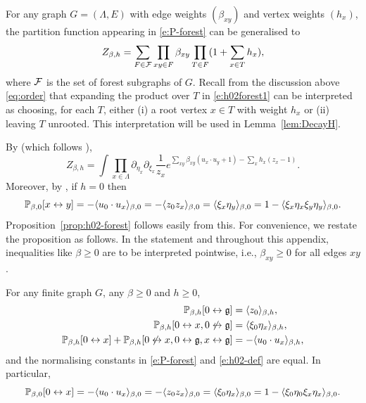 \documentclass[11pt]{amsart}
\numberwithin{equation}{section}
\numberwithin{theorem}{section}
\newcommand{\ghost}{\mathfrak{g}}
\newcommand{\conn}{\leftrightarrow}
\newcommand{\nconn}{\not\leftrightarrow}
\newcommand{\1}{{\bf 1}}
\begin{document}
For any graph $G=(\Lambda,E)$ with edge weights $(\beta_{xy})$ and
vertex weights $(h_x)$, the partition function appearing in
\eqref{e:P-forest} can be generalised to
\begin{equation} \label{e:h02forest1}
  Z_{\beta,h}
  = \sum_{F\in\mathcal F} \prod_{xy\in F}\beta_{xy}\prod_{T\in F} (1+\sum_{x\in T}h_{x}),
\end{equation}
where $\mathcal F$ is the set of forest subgraphs of $G$.
Recall from
the discussion above \eqref{eq:order} that expanding the product over $T$
in \eqref{e:h02forest1} can be interpreted as choosing, for each $T$, either (i) a
root vertex $x\in T$ with weight $h_{x}$ or (ii) leaving $T$
unrooted. This interpretation will be used in Lemma~\ref{lem:DecayH}.

By \cite[Theorem~2.1]{MR4218682} (which follows \cite{MR2110547}),
\begin{equation} \label{e:h02forest2}
  Z_{\beta,h}
  =
  \int \prod_{x\in\Lambda} \partial_{\eta_x}\partial_{\xi_x} \frac{1}{z_x} e^{\sum_{xy}\beta_{xy}(u_x\cdot u_y+1) - \sum_{x} h_x(z_x-1)}.
\end{equation}
Moreover, by \cite[Corollary~2.2]{MR4218682}, if $h=0$ then
\begin{equation} \label{e:Pxconny}
  \P_{\beta,0}[x\conn y] = -\avg{u_0\cdot u_x}_{\beta,0}
  = -\avg{z_0z_x}_{\beta,0} = \avg{\xi_x\eta_y}_{\beta,0}
  = 1-\avg{\xi_x\eta_x\xi_y\eta_y}_{\beta,0}.
\end{equation}
Proposition~\ref{prop:h02-forest} follows easily from this.
For convenience, we restate the proposition as follows.
In the statement and throughout this appendix, inequalities like $\beta\geq 0$
are to be interpreted pointwise, i.e., $\beta_{xy}\geq 0$ for all edges $xy$.

\begin{proposition} \label{prop:h02-forest-app}
  For any finite graph $G$, 
  any $\beta \geq 0$ and $h \geq 0$,
  \begin{align} \label{e:zforest-app}
    \P_{\beta,h}[0\conn \ghost]
    &= \avg{z_0}_{\beta,h},
    \\
    \label{e:xietaforest-app}
    \P_{\beta,h}[0\conn x, 0 \nconn \ghost]
    &= \avg{\xi_0\eta_x}_{\beta,h},
    \\
    \label{e:u0uxforest-app}
    \P_{\beta,h}[0\conn x]+\P_{\beta,h}[0\nconn x, 0\conn \ghost, x\conn\ghost]
    &= -\avg{u_0\cdot u_x}_{\beta,h}
      ,
  \end{align}
  and the normalising constants in \eqref{e:P-forest} and \eqref{e:h02-def} are equal.
  In particular,
  \begin{equation} \label{e:P0x4pt-app}
    \P_{\beta,0}[0\conn x] = -\avg{u_0\cdot u_x}_{\beta,0} = -\avg{z_0z_x}_{\beta,0} = \avg{\xi_0\eta_x}_{\beta,0} = 1-\avg{\xi_0\eta_0\xi_x\eta_x}_{\beta,0}.
  \end{equation}
\end{proposition}
\end{document}
